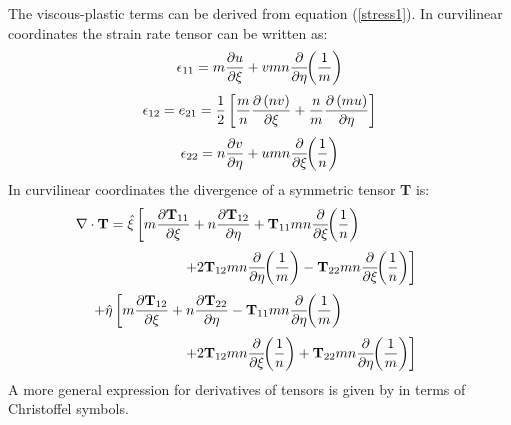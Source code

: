 The viscous-plastic terms can be derived from equation
(\ref{stress1}).  In curvilinear coordinates the strain rate tensor
can be written as:
\begin{equation}
   \epsilon_{11} = m {\partial u \over \partial \xi} +
    vmn {\partial \over \partial \eta} \!\! \left( {1 \over m} \right)
\end{equation}
\begin{equation}
   \epsilon_{12} = e_{21} = {1 \over 2} \left[
   {m \over n} {\partial \left( nv \right) \over \partial \xi}
   + {n \over m} {\partial \left( mu \right) \over \partial \eta}
   \right]
\end{equation}
\begin{equation}
   \epsilon_{22} = n {\partial v \over \partial \eta} +
    umn {\partial \over \partial \xi} \!\! \left( {1 \over n} \right)
\end{equation}
In curvilinear coordinates the divergence of a symmetric tensor {\bf T}
is:
\[
    \nabla \cdot \mbox{\bf T} =
    \hat{\xi} \left[ m
    {\partial \mbox{\bf T}_{11} \over \partial \xi}
    + n {\partial \mbox{\bf T}_{12} \over \partial \eta}
    + \mbox{\bf T}_{11} mn {\partial \over \partial \xi} \!\!
    \left( {1 \over n} \right) \right. \mbox{\hspace{2 cm}}
\]
\[
    \mbox{\hspace{2 cm}} \left. + 2 \mbox{\bf T}_{12} mn
    {\partial \over \partial \eta} \!\! \left( {1 \over m} \right)
    - \mbox{\bf T}_{22} mn
    {\partial \over \partial \xi} \!\! \left( {1 \over n} \right)
    \right]
\]
\[
    + \hat{\eta} \left[ m
    {\partial \mbox{\bf T}_{12} \over \partial \xi}
    + n {\partial \mbox{\bf T}_{22} \over \partial \eta}
    - \mbox{\bf T}_{11} mn {\partial \over \partial \eta} \!\!
    \left( {1 \over m} \right) \right. \mbox{\hspace{2 cm}}
\]
\begin{equation}
    \mbox{\hspace{2 cm}} \left. + 2 \mbox{\bf T}_{12} mn
    {\partial \over \partial \xi} \!\! \left( {1 \over n} \right)
    + \mbox{\bf T}_{22} mn
    {\partial \over \partial \eta} \!\! \left( {1 \over m} \right)
    \right]
\end{equation}
A more general expression for derivatives of tensors is given by
\cite{Aris} in terms of Christoffel symbols.

